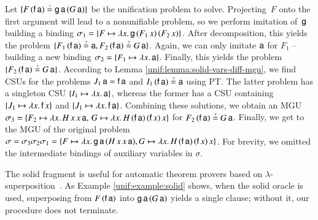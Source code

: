  \begin{exa}
   \label{unif:example:solid}
  Let $\{F \, (\cst{f} \, \cst{a}) \unif \cst{g} \, \cst{a} \, (G \, \cst{a})\}$ be
  the unification problem to solve. Projecting~$F$ onto the first argument will
  lead to a nonunifiable problem, so we perform imitation of~$\mathsf{g}$ building a
  binding $\sigma_1 = \{ F \mapsto \lambda x.\, \mathsf{g} \, (F_1 \, x) \, (F_2 \, x)
  \}$. After decomposition, this yields the  problem $\{F_1
  \, (\cst{f} \, \cst{a}) \unif \cst{a}, \allowbreak F_2 \, (\cst{f} \, \cst{a}) \unif G \,
  \cst{a}\}$. Again, we can only imitate $\mathsf{a}$ for $F_1$ -- building a new 
  binding $\sigma_2 = \{F_1 \mapsto \lambda x.\, \mathsf{a} \}$. Finally, this
  yields the problem $\{ F_2 \, (\cst{f} \, \cst{a}) \unif G \, \cst{a} \}$.
  According to Lemma \ref{unif:lemma:solid-vars-diff-mgu}, we find CSUs for the
  problems $J_1 \, \mathsf{a} = \mathsf{f} \, \mathsf{a}$ and $I_1 \, (\cst{f} \, \cst{a})
  \unif \cst{a}$ using PT. The latter problem has a singleton CSU $\{I_1 \mapsto \lambda x.\,
  \mathsf{a}\}$, whereas the former has a CSU containing $\{ J_1 \mapsto \lambda x.\,
  \mathsf{f} \, x \}$ and $\{ J_1 \mapsto \lambda x.\, \mathsf{f} \, \mathsf{a} \}$.
  Combining these solutions, we obtain an MGU $\sigma_3 =
  \{ F_2 \mapsto \lambda x.\, H \, x \, x \, \mathsf{a},\,
  G   \mapsto \lambda x.\, H \, (\mathsf{f} \, \mathsf{a}) \, (\mathsf{f} \, x) \, x \}$ 
  for $F_2 \, (\cst{f}\, \cst{a}) \unif G \, \cst{a}$.
  Finally, we get to the MGU of the original problem $\sigma = \sigma_3 \sigma_2 \sigma_1 = \{ F
  \mapsto \lambda x.\, \mathsf{g} \, \mathsf{a} \, (H \, x \, x \, \mathsf{a}),\allowbreak G \mapsto
  \lambda x.\, H \, (\mathsf{f} \, \mathsf{a}) \, (\mathsf{f} \, x) \, x  \}$.
  For brevity, we omitted the intermediate bindings of auxiliary variables
  in $\sigma$.
\end{exa}

The solid fragment is useful for automatic theorem provers based on
$\lambda$-su\-per\-po\-si\-tion~\cite{bbtvw-21-sup-lam}. As Example \ref{unif:example:solid} shows, when the solid oracle
is used, superposing from $F \, (\mathsf{f} \, \mathsf{a})$ into $\mathsf{g} \, \mathsf{a}
\, (G \, \mathsf{a})$ yields a single clause; without it, our procedure does not
terminate.


